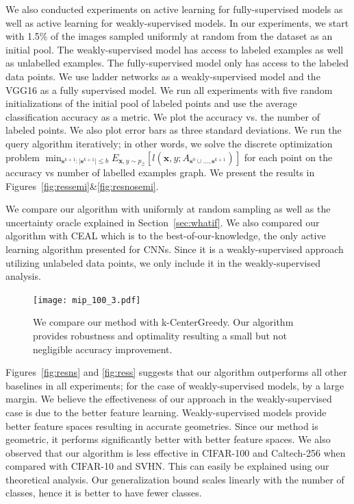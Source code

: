 \documentclass{article}
\begin{document}
We also conducted experiments on active learning for fully-supervised models as well as active learning for weakly-supervised models. In our experiments, we start with 1.5\% of the images sampled uniformly at random from the dataset as an initial pool. The weakly-supervised model has access to labeled examples as well as unlabelled examples. The fully-supervised model only has access to the labeled data points. We use ladder networks\cite{ladder} as a weakly-supervised model and the VGG16\cite{vgg} as a fully supervised model. We run all experiments with five random initializations of the initial pool of labeled points and use the average classification accuracy as a metric. We plot the accuracy vs. the number of labeled points. We also plot error bars as three standard deviations. We run the query algorithm iteratively; in other words, we solve the discrete optimization problem $\min_{\mathbf{s}^{k+1} : |\mathbf{s}^{k+1}| \leq b} E_{\mathbf{x},y \sim p_\mathcal{Z}} [l(\mathbf{x},y; A_{\mathbf{s}^{0} \cup \ldots, \mathbf{s}^{k+1}})]$ for each point on the accuracy vs number of labelled examples graph. We present the results in Figures~\ref{fig:ressemi}\&\ref{fig:resnosemi}.


We compare our algorithm with uniformly at random sampling as well as the uncertainty oracle explained in Section~\ref{sec:whatif}. We also compared our algorithm with CEAL \cite{wang2016cost} which is to the best-of-our-knowledge, the only active learning algorithm presented for CNNs. Since it is a weakly-supervised approach utilizing unlabeled data points, we only include it in the weakly-supervised analysis.

 \begin{figure}
\texttt{[image: mip\_100\_3.pdf]}
\caption{We compare our method with k-CenterGreedy. Our algorithm provides robustness and optimality resulting a small but not negligible accuracy improvement. }
\label{fig:twoopt}
\vspace{-5mm}
\end{figure}

Figures~\ref{fig:resns} and \ref{fig:ress} suggests that our algorithm outperforms all other baselines in all experiments; for the case of weakly-supervised models, by a large margin. We believe the effectiveness of our approach in the weakly-supervised case is due to the better feature learning. Weakly-supervised models provide better feature spaces resulting in accurate geometries. Since our method is geometric, it performs significantly better with better feature spaces. We also observed that our algorithm is less effective in CIFAR-100 and Caltech-256 when compared with CIFAR-10 and SVHN. This can easily be explained using our theoretical analysis. Our generalization bound scales linearly with the number of classes, hence it is better to have fewer classes.
\end{document}
